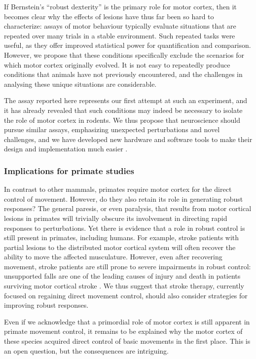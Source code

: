 If Bernstein’s ``robust dexterity'' is the primary role for motor cortex, then it becomes clear why the effects of lesions have thus far been so hard to characterize: assays of motor behaviour typically evaluate situations that are repeated over many trials in a stable environment. Such repeated tasks were useful, as they offer improved statistical power for quantification and comparison. However, we propose that these conditions specifically exclude the scenarios for which motor cortex originally evolved. It is not easy to repeatedly produce conditions that animals have not previously encountered, and the challenges in analysing these unique situations are considerable.

The assay reported here represents our first attempt at such an experiment, and it has already revealed that such conditions may indeed be necessary to isolate the role of motor cortex in rodents. We thus propose that neuroscience should pursue similar assays, emphasizing unexpected perturbations and novel challenges, and we have developed new hardware and software tools to make their design and implementation much easier \cite{Lopes2015a}.

\subsubsection*{Implications for primate studies}

In contrast to other mammals, primates require motor cortex for the direct control of movement. However, do they also retain its role in generating robust responses? The general paresis, or even paralysis, that results from motor cortical lesions in primates will trivially obscure its involvement in directing rapid responses to perturbations. Yet there is evidence that a role in robust control is still present in primates, including humans. For example, stroke patients with partial lesions to the distributed motor cortical system will often recover the ability to move the affected musculature. However, even after recovering movement, stroke patients are still prone to severe impairments in robust control: unsupported falls are one of the leading causes of injury and death in patients surviving motor cortical stroke \cite{Jacobs2014}. We thus suggest that stroke therapy, currently focused on regaining direct movement control, should also consider strategies for improving robust responses.

Even if we acknowledge that a primordial role of motor cortex is still apparent in primate movement control, it remains to be explained why the motor cortex of these species acquired direct control of basic movements in the first place. This is an open question, but the consequences are intriguing.


